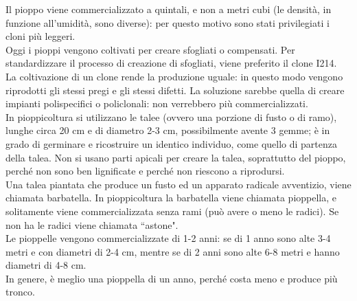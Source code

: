 Il pioppo viene commercializzato a quintali, e non a metri cubi (le densità, in funzione all'umidità, sono diverse): per questo motivo sono stati privilegiati i cloni più leggeri.\\
Oggi i pioppi vengono coltivati per creare sfogliati o compensati. Per standardizzare il processo di creazione di sfogliati, viene preferito il clone I214.\\
La coltivazione di un clone rende la produzione uguale: in questo modo vengono riprodotti gli stessi pregi e gli stessi difetti. La soluzione sarebbe quella di creare impianti polispecifici o policlonali: non verrebbero più commercializzati.\\
In pioppicoltura si utilizzano le talee (ovvero una porzione di fusto o di ramo), lunghe circa 20 cm e di diametro 2-3 cm, possibilmente avente 3 gemme; è in grado di germinare e ricostruire un identico individuo, come quello di partenza della talea. Non si usano parti apicali per creare la talea, soprattutto del pioppo, perché non sono ben lignificate e perché non riescono a riprodursi.\\
Una talea piantata che produce un fusto ed un apparato radicale avventizio, viene chiamata barbatella. In pioppicoltura la barbatella viene chiamata pioppella, e solitamente viene commercializzata senza rami (può avere o meno le radici). Se non ha le radici viene chiamata ``astone".\\
Le pioppelle vengono commercializzate di 1-2 anni: se di 1 anno sono alte 3-4 metri e con diametri di 2-4 \unit{cm}, mentre se di 2 anni sono alte 6-8 metri e hanno diametri di 4-8 \unit{cm}.\\
In genere, è meglio una pioppella di un anno, perché costa meno e produce più tronco.
